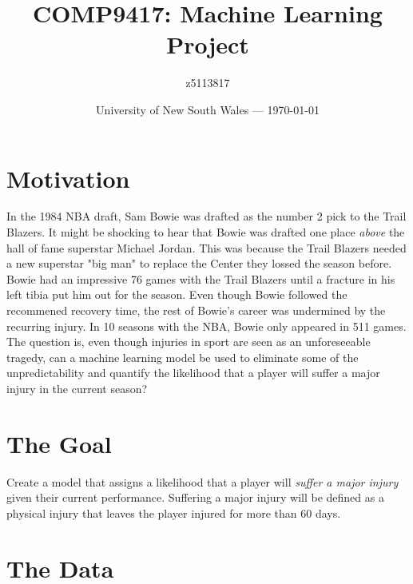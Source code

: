 \documentclass{article}
\title{COMP9417: Machine Learning Project} %
\author{z5113817} %
\date{University of New South Wales --- \today} %
\begin{document}
\maketitle %



\section*{Motivation}

In the 1984 NBA draft, Sam Bowie was drafted as the number 2 pick to the Trail Blazers.
It might be shocking to hear that Bowie was drafted one place \emph{above} the hall of fame superstar Michael Jordan.
This was because the Trail Blazers needed a new superstar "big man" to replace the Center they lossed the season before.
Bowie had an impressive 76 games with the Trail Blazers until a fracture in his left tibia put him out for the season.
Even though Bowie followed the recommened recovery time, the rest of Bowie's career was undermined by the recurring injury.
In 10 seasons with the NBA, Bowie only appeared in 511 games.\\

The question is, even though injuries in sport are seen as an unforeseeable tragedy, can a
machine learning model be used to eliminate some of the unpredictability and quantify 
the likelihood that a player will suffer a major injury in the current season?

\section*{The Goal}

Create a model that assigns a likelihood that a player will \emph{suffer a major injury}
given their current performance. Suffering a major injury will be defined as a physical 
injury that leaves the player injured for more than 60 days. %


\newpage


\section*{The Data}
\end{document}
